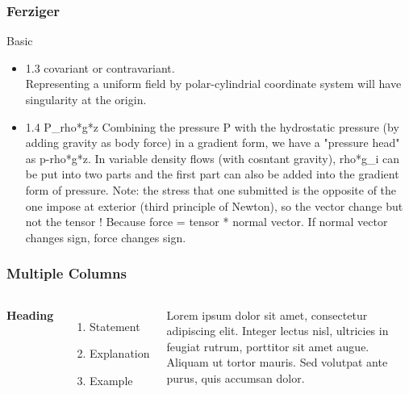 \documentclass{beamer}
\begin{document}
\begin{frame}
\frametitle{Ferziger}

\begin{block}{Basic}
\begin{itemize}
\item 1.3 covariant or contravariant. \\
Representing a uniform field by polar-cylindrial coordinate system will have singularity at the origin.

\item 1.4 P\_rho*g*z
Combining the pressure P with the hydrostatic pressure (by adding gravity as body force) in a gradient form, we have a "pressure head" as p-rho*g*z.
In variable density flows (with cosntant gravity), rho*g\_i can be put into two parts and the first part can also be added into the gradient form of pressure.
Note: the stress that one submitted is the opposite of the one impose at exterior (third principle of Newton), so the vector change but not the tensor ! Because force = tensor * normal vector. If normal vector changes sign, force changes sign.
\end{itemize}
\end{block}

\end{frame}





\begin{frame}
\frametitle{Multiple Columns}
\begin{columns}[c] %

\textbf{Heading}
\begin{enumerate}
\item Statement
\item Explanation
\item Example
\end{enumerate}

Lorem ipsum dolor sit amet, consectetur adipiscing elit. Integer lectus nisl, ultricies in feugiat rutrum, porttitor sit amet augue. Aliquam ut tortor mauris. Sed volutpat ante purus, quis accumsan dolor.

\end{columns}
\end{frame}
\end{document}
